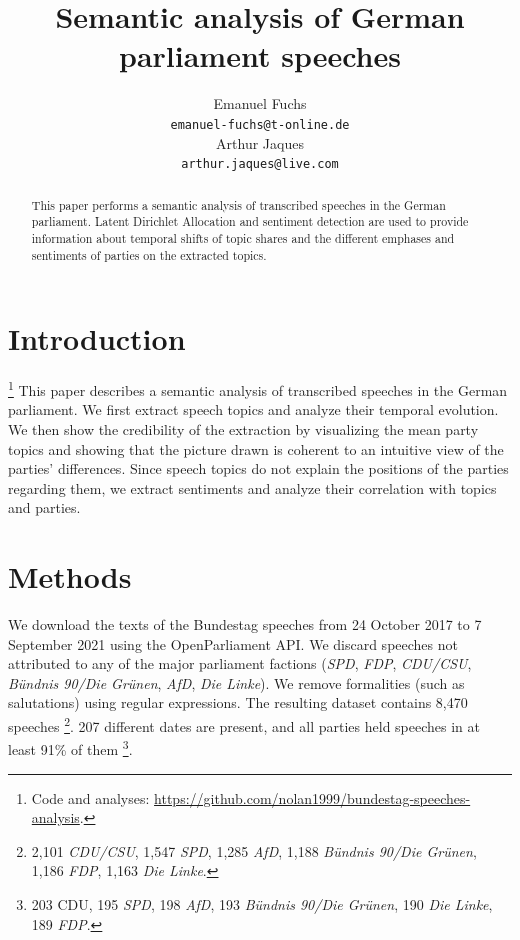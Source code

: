 \documentclass{article}
\title{Semantic analysis of German parliament speeches}
\author{%
  Emanuel Fuchs\\
  \texttt{emanuel-fuchs@t-online.de} \\
  \And
  Arthur Jaques\\
  \texttt{arthur.jaques@live.com} \\
}
\begin{document}
\maketitle


\begin{abstract}
  This paper performs a semantic analysis of transcribed speeches in the German parliament.
  Latent Dirichlet Allocation and sentiment detection are used to provide information about temporal shifts of topic shares and the different emphases and sentiments of parties on the extracted topics. 
\end{abstract}


\section{Introduction}
\footnote{Code and analyses: \url{https://github.com/nolan1999/bundestag-speeches-analysis}.}
This paper describes a semantic analysis of transcribed speeches in the German parliament. 
We first extract speech topics and analyze their temporal evolution.
We then show the credibility of the extraction by visualizing the mean party topics and showing that the picture drawn is coherent to an intuitive view of the parties' differences.
Since speech topics do not explain the positions of the parties regarding them, we extract sentiments and analyze their correlation with topics and parties.


\section{Methods}
We download the texts of the Bundestag speeches from 24 October 2017 to 7 September 2021 using the OpenParliament \cite{OpenParliamentTV} API.
We discard speeches not attributed to any of the major parliament factions (\textit{SPD}, \textit{FDP}, \textit{CDU/CSU}, \textit{Bündnis 90/Die Grünen}, \textit{AfD}, \textit{Die Linke}).
We remove formalities (such as salutations) using regular expressions.
The resulting dataset contains 8,470 speeches
\footnote{2,101 \textit{CDU/CSU}, 1,547 \textit{SPD}, 1,285 \textit{AfD}, 1,188 \textit{Bündnis 90/Die Grünen}, 1,186 \textit{FDP}, 1,163 \textit{Die Linke}.}.
207 different dates are present, and all parties held speeches in at least 91\% of them
\footnote{203 CDU, 195 \textit{SPD}, 198 \textit{AfD}, 193 \textit{Bündnis 90/Die Grünen}, 190 \textit{Die Linke}, 189 \textit{FDP}.}.
\end{document}

